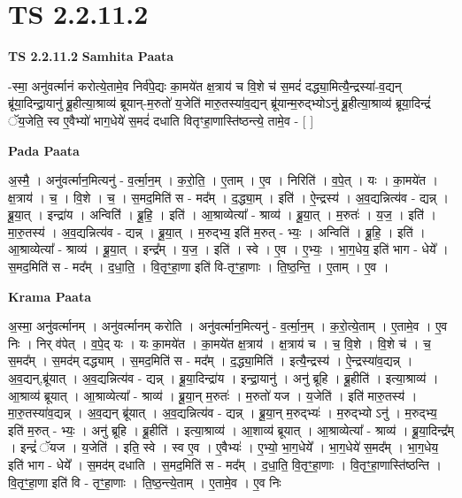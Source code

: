 \documentclass[17pt]{extarticle}
\begin{document}
\section*{ TS 2.2.11.2 }

\textbf{TS 2.2.11.2 } \newline
\textbf{Samhita Paata} \newline

-स्मा॒ अनु॑वर्त्मानं करोत्ये॒तामे॒व निर्व॑पे॒द्यः का॒मये॑त क्ष॒त्राय॑ च वि॒शे च॑ स॒मदं॑ दद्ध्या॒मित्यै॒न्द्रस्या॑-व॒द्यन् ब्रू॑या॒दिन्द्रा॒यानु॑ ब्रू॒हीत्या॒श्राव्य॑ ब्रूयान्-म॒रुतो॑ य॒जेति॑ मारु॒तस्या॑व॒द्यन् ब्रू॑यान्म॒रुद्भ्योऽनु॑ ब्रू॒हीत्या॒श्राव्य॑ ब्रूया॒दिन्द्रं॑ ॅय॒जेति॒ स्व ए॒वैभ्यो॑ भाग॒धेये॑ स॒मदं॑ दधाति वितृꣳहा॒णास्ति॑ष्ठन्त्ये॒ तामे॒व - [  ] \newline

\textbf{Pada Paata} \newline

अ॒स्मै॒ । अनु॑वर्त्मान॒मित्यनु॑ - व॒र्त्मा॒न॒म् । क॒रो॒ति॒ । ए॒ताम् । ए॒व । निरिति॑ । व॒पे॒त् । यः । का॒मये॑त । क्ष॒त्राय॑ । च॒ । वि॒शे । च॒ । स॒मद॒मिति॑ स - मद᳚म् । द॒द्ध्या॒म् । इति॑ । ऐ॒न्द्रस्य॑ । अ॒व॒द्यन्नित्य॑व - द्यन्न् । ब्रू॒या॒त् । इन्द्रा॑य । अन्विति॑॑ । ब्रू॒हि॒ । इति॑ । आ॒श्राव्येत्या᳚ - श्राव्य॑ । ब्रू॒या॒त् । म॒रुतः॑ । य॒ज॒ । इति॑ । मा॒रु॒तस्य॑ । अ॒व॒द्यन्नित्य॑व - द्यन्न् । ब्रू॒या॒त् । म॒रुद्भ्य॒ इति॑ म॒रुत् - भ्यः॒ । अन्विति॑ । ब्रू॒हि॒ । इति॑ । आ॒श्राव्येत्या᳚ - श्राव्य॑ । ब्रू॒या॒त् । इन्द्र᳚म् । य॒ज॒ । इति॑ । स्वे । ए॒व । ए॒भ्यः॒ । भा॒ग॒धेय॒ इति॑ भाग - धेये᳚ । स॒मद॒मिति॑ स - मद᳚म् । द॒धा॒ति॒ । वि॒तृꣳ॒॒हा॒णा इति॑ वि-तृꣳ॒॒हा॒णाः । ति॒ष्ठ॒न्ति॒ । ए॒ताम् । ए॒व ।  \newline


\textbf{Krama Paata} \newline

अ॒स्मा॒ अनु॑वर्त्मानम् । अनु॑वर्त्मानम् करोति । अनु॑वर्त्मान॒मित्यनु॑ - व॒र्त्मा॒न॒म् । क॒रो॒त्ये॒ताम् । ए॒तामे॒व । ए॒व निः । निर् व॑पेत् । व॒पे॒द् यः । यः का॒मये॑त । का॒मये॑त क्ष॒त्राय॑ । क्ष॒त्राय॑ च । च॒ वि॒शे । वि॒शे च॑ । च॒ स॒मद᳚म् । स॒मद॑म् दद्ध्याम् । स॒मद॒मिति॑ स - मद᳚म् । द॒द्ध्या॒मिति॑ । इत्यै॒न्द्रस्य॑ । ऐ॒न्द्रस्या॑व॒द्यन्न् । अ॒व॒द्यन्,ब्रू॑यात् । अ॒व॒द्यन्नित्य॑व - द्यन्न् । ब्रू॒या॒दिन्द्रा॑य । इन्द्रा॒यानु॑ । अनु॑ ब्रूहि । ब्रू॒हीति॑ । इत्या॒श्राव्य॑ । आ॒श्राव्य॑ ब्रूयात् । आ॒श्राव्येत्या᳚ - श्राव्य॑ । ब्रू॒या॒न् म॒रुतः॑ । म॒रुतो॑ यज । य॒जेति॑ । इति॑ मारु॒तस्य॑ । मा॒रु॒तस्या॑व॒द्यन्न् । अ॒व॒द्यन् ब्रू॑यात् । अ॒व॒द्यन्नित्य॑व - द्यन्न् । ब्रू॒या॒न् म॒रुद्भ्यः॑ । म॒रुद्भ्यो ऽनु॑ । म॒रुद्भ्य॒ इति॑ म॒रुत् - भ्यः॒ । अनु॑ ब्रूहि । ब्रू॒हीति॑ । इत्या॒श्राव्य॑ । आ॒शाव्य॑ ब्रूयात् । आ॒श्राव्येत्या᳚ - श्राव्य॑ । ब्रू॒या॒दिन्द्र᳚म् । इन्द्रं॑ ॅयज । य॒जेति॑ । इति॒ स्वे । स्व ए॒व । ए॒वैभ्यः॑ । ए॒भ्यो॒ भा॒ग॒धेये᳚ । भा॒ग॒धेये॑ स॒मद᳚म् । भा॒ग॒धेय॒ इति॑ भाग - धेये᳚ । स॒मद॑म् दधाति । स॒मद॒मिति॑ स - मद᳚म् । द॒धा॒ति॒ वि॒तृꣳ॒॒हा॒णाः । वि॒तृꣳ॒॒हा॒णास्ति॑ष्ठन्ति । वि॒तृꣳ॒॒हा॒णा इति॑ वि - तृꣳ॒॒हा॒णाः । ति॒ष्ठ॒न्त्ये॒ताम् । ए॒तामे॒व । ए॒व निः \newline
\end{document}
